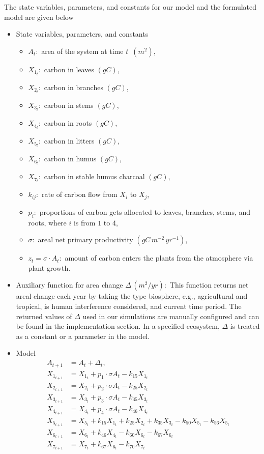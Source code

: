 \documentclass[a4paper]{article}
\begin{document}
The state variables, parameters, and constants for our model and the formulated model are given below 
\begin{itemize}
    \item State variables, parameters, and constants \begin{itemize}
        \item $A_t:$ area of the system at time $t$ $\, (m^2)$,
        \item $X_{1_t}:$ carbon in leaves $(gC)$,
        \item $X_{2_t}:$ carbon in branches $(gC)$,
        \item $X_{3_t}:$ carbon in stems $(gC)$,
        \item $X_{4_t}:$ carbon in roots $(gC)$,
        \item $X_{5_t}:$ carbon in litters $(gC)$,
        \item $X_{6_t}:$ carbon in humus $(gC)$,
        \item $X_{7_t}:$ carbon in stable humus charcoal $(gC)$,
        \item $k_{ij}:$ rate of carbon flow from $X_i$ to $X_j$, 
        \item $p_i:$ proportions of carbon gets allocated to leaves, branches, stems, and roots, where $i$ is from $1$ to $4$,
        \item $\sigma:$ areal net primary productivity $(gC \, m^{-2} \, yr^{-1})$,
        \item $z_t = \sigma \cdot A_t:$ amount of carbon enters the plants from the atmosphere via plant growth. 
    \end{itemize}
    \item Auxiliary function for area change $\Delta \, (m^2/yr):$
        This function returns net areal change each year by taking the type biosphere, e.g., agricultural and tropical, is human interference considered, and current time period. The returned values of $\Delta$ used in our simulations are manually configured and can be found in the implementation section. In a specified ecosystem, $\Delta$ is treated as a constant or a parameter in the model. 
    \item Model \begin{align}
        A_{t+1} &= A_t + \Delta_t, \\
        X_{1_{t+1}} &= X_{1_{t}} + p_1 \cdot \sigma A_t - k_{15}X_{1_{t}}\\
        X_{2_{t+1}} &= X_{2_{t}} + p_2\cdot \sigma A_t - k_{25}X_{2_{t}}\\
        X_{3_{t+1}} &= X_{3_{t}} + p_3\cdot \sigma A_t - k_{35}X_{3_{t}}\\
        X_{4_{t+1}} &= X_{4_{t}} + p_4\cdot \sigma A_t - k_{46}X_{4_{t}}\\
        X_{5_{t+1}} &= X_{5_{t}} + k_{15}X_{1_{t}} + k_{25}X_{2_{t}} + k_{35}X_{3_{t}} - k_{50}X_{5_{t}} - k_{56}X_{5_{t}}\\
        X_{6_{t+1}} &= X_{6_{t}} + k_{46}X_{4_{t}} - k_{60}X_{6_{t}} - k_{67}X_{6_{t}}\\
        X_{7_{t+1}} &= X_{7_{t}} + k_{67}X_{6_{t}} - k_{70}X_{7_{t}}
    \end{align}
\end{itemize}
\end{document}
